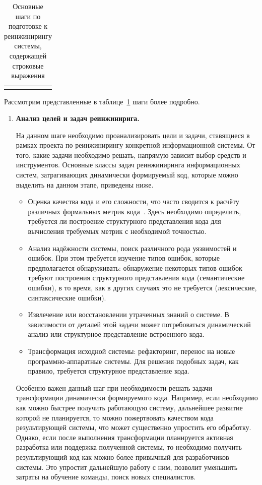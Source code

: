 {\begin{longtable}{| r | p{3cm} | p{3cm} | p{3cm} | p{6cm} |}
  \hline
  \hline
  \caption{Основные шаги по подготовке к реинжинирингу системы, содержащей строковые выражения}\label{tbl:method}
  \end{longtable}
}

Рассмотрим представленные в таблице~\ref{tbl:method} шаги более подробно.

\begin{enumerate}
  \item \textbf{Анализ целей и задач реинжинирига.}
  
  На данном шаге необходимо проанализировать цели и задачи, ставящиеся в рамках проекта по реинжинирингу конкретной информационной системы. От того, какие задачи необходимо решать, напрямую зависит выбор средств и инструментов. Основные классы задач реинжиниринга информационных систем, затрагивающих динамически формируемый код, которые можно выделить на данном этапе, приведены ниже.
  
  \begin{itemize}
    \item Оценка качества кода и его сложности, что часто сводится к расчёту различных формальных метрик кода~\cite{SoftwareMetrics, DSQLQualityMesureBIG}. Здесь необходимо определить, требуется ли построение структурного представления кода для вычисления требуемых метрик с необходимой точностью.
    \item Анализ надёжности системы, поиск различного рода уязвимостей и ошибок. При этом требуется изучение типов ошибок, которые предполагается обнаруживать: обнаружение некоторых типов ошибок требуют построения структурного представления кода (семантические ошибки), в то время, как в других случаях это не требуется (лексические, синтаксические ошибки).
    \item Извлечение или восстановлении утраченных знаний о системе. В зависимости от деталей этой задачи может потребоваться динамический анализ или структурное представление встроенного кода.
    \item Трансформация исходной системы: рефакторинг, перенос на новые программно-аппаратные системы. Для решения подобных задач, как правило, требуется структурное представление кода.
  \end{itemize}
  
Особенно важен данный шаг при необходимости решать задачи трансформации динамически формируемого кода. Например, если необходимо как можно быстрее получить работающую систему, дальнейшее развитие которой не планируется, то можно пожертвовать качеством кода результирующей системы, что может существенно упростить его обработку. Однако, если после выполнения трансформации планируется активная разработка или поддержка полученной системы, то необходимо получить результирующий код как можно более привычный для разработчиков системы. Это упростит дальнейшую работу с ним, позволит уменьшить затраты на обучение команды, поиск новых специалистов.
  

\end{enumerate}
